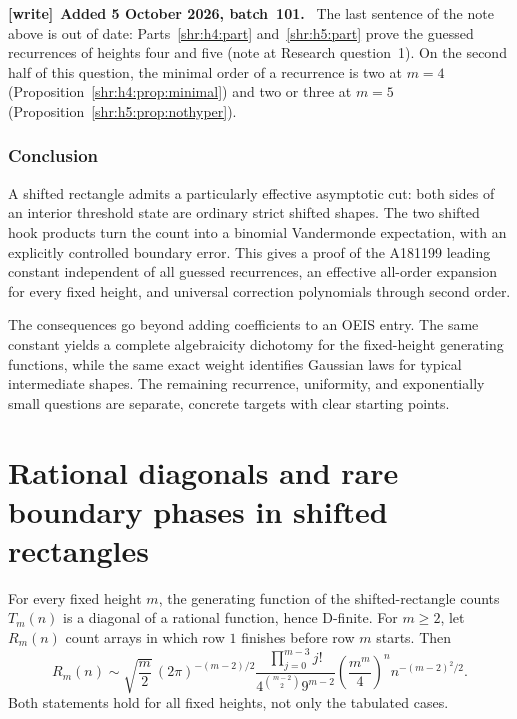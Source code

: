 \documentclass[11pt,letterpaper]{article}
\numberwithin{equation}{section}
\theoremstyle{definition}
\newcommand{\1}{\mathbf 1}
\newenvironment{writenote}[1][]{\par\smallskip\begingroup\small
 \noindent\textbf{[write]}\if\relax\detokenize{#1}\relax\else~\textbf{#1.}\fi\ }%
 {\par\endgroup\smallskip}
\begin{document}
\begin{writenote}[Added 5 October 2026, batch~101]
The last sentence of the note above is out of date:
Parts~\ref{shr:h4:part} and~\ref{shr:h5:part} prove the guessed recurrences
of heights four and five (note at Research question~1). On the second half
of this question, the minimal order of a recurrence is two at $m=4$
(Proposition~\ref{shr:h4:prop:minimal}) and two or three at $m=5$
(Proposition~\ref{shr:h5:prop:nothyper}).
\end{writenote}

\section{Conclusion}
A shifted rectangle admits a particularly effective asymptotic cut: both
sides of an interior threshold state are ordinary strict shifted shapes.
The two shifted hook products turn the count into a binomial Vandermonde
expectation, with an explicitly controlled boundary error. This gives a
proof of the A181199 leading constant independent of all guessed
recurrences, an effective all-order expansion for every fixed height,
and universal correction polynomials through second order.

The consequences go beyond adding coefficients to an OEIS entry. The
same constant yields a complete algebraicity dichotomy for the fixed-height
generating functions, while the same exact weight identifies Gaussian
laws for typical intermediate shapes. The remaining recurrence, uniformity,
and exponentially small questions are separate, concrete targets with
clear starting points.

\clearpage
\part{Rational diagonals and rare boundary phases in shifted rectangles}
\label{shr:bp:part}

\smallskip
{}
\medskip

\begin{resultbox}
For every fixed height $m$, the generating function of the shifted-rectangle
counts $T_m(n)$ is a diagonal of a rational function, hence D-finite.
For $m\ge2$, let $R_m(n)$ count arrays in which row $1$ finishes before row $m$ starts. Then
\[
 R_m(n)\sim
 \sqrt{\frac m2}\,(2\pi)^{-(m-2)/2}
 \frac{\prod_{j=0}^{m-3}j!}{4^{\binom{m-2}{2}}9^{m-2}}
 \left(\frac{m^m}{4}\right)^n n^{-(m-2)^2/2}.
\]
Both statements hold for all fixed heights, not only the tabulated cases.
\end{resultbox}
\end{document}
